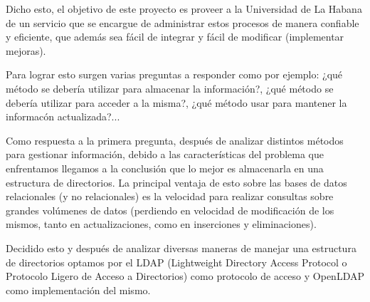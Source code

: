 \begin{introduction}

Dicho esto, el objetivo de este proyecto es proveer a la Universidad de La Habana de un servicio que se encargue de administrar estos procesos de manera confiable y eficiente,
que además sea fácil de integrar y fácil de modificar (implementar mejoras).

Para lograr esto surgen varias preguntas a responder como por ejemplo: ¿qué método 
se debería utilizar para almacenar la información?, ¿qué método se debería utilizar 
para acceder a la misma?, ¿qué método usar para mantener la informacón actualizada?... 

Como respuesta a la primera pregunta, después de analizar distintos métodos para gestionar información, debido a las características del problema que enfrentamos llegamos a la conclusión que lo mejor es almacenarla en una estructura de directorios. La principal ventaja de esto sobre las bases de datos relacionales (y no relacionales) es la velocidad para realizar consultas sobre grandes volúmenes de datos (perdiendo en velocidad de modificación de los mismos, tanto en actualizaciones, como en inserciones y eliminaciones).

\newpage

Decidido esto y después de analizar diversas maneras de manejar una estructura de directorios optamos por el LDAP (Lightweight Directory Access Protocol o Protocolo Ligero de Acceso a Directorios) como protocolo de acceso y OpenLDAP como implementación del mismo.


\end{introduction}
